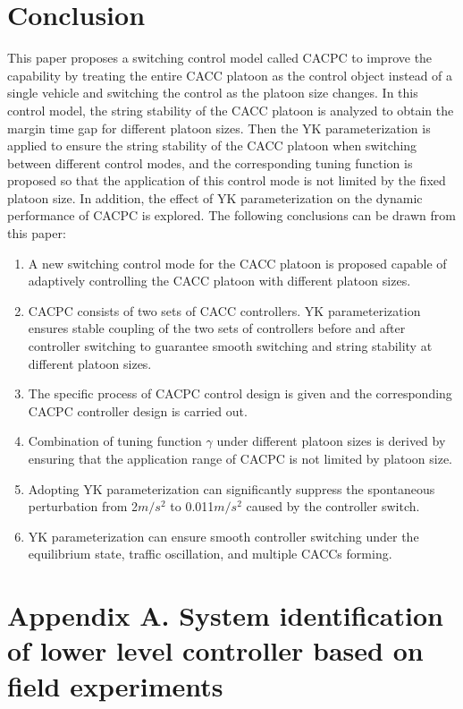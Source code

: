 \documentclass[journal]{IEEEtran}
\begin{document}
\section{Conclusion}
\label{Section 6}

This paper proposes a switching control model called CACPC to improve the capability by treating the entire CACC platoon as the control object instead of a single vehicle and switching the control as the platoon size changes. In this control model, the string stability of the CACC platoon is analyzed to obtain the margin time gap for different platoon sizes. Then the YK parameterization is applied to ensure the string stability of the CACC platoon when switching between different control modes, and the corresponding tuning function is proposed so that the application of this control mode is not limited by the fixed platoon size. In addition, the effect of YK parameterization on the dynamic performance of CACPC is explored. The following conclusions can be drawn from this paper:
\begin{enumerate}
  \item A new switching control mode for the CACC platoon is proposed capable of adaptively controlling the CACC platoon with different platoon sizes.
  \item CACPC consists of two sets of CACC controllers. YK parameterization ensures stable coupling of the two sets of controllers before and after controller switching to guarantee smooth switching and string stability at different platoon sizes.
  \item The specific process of CACPC control design is given and the corresponding CACPC controller design is carried out.
  \item Combination of tuning function $\gamma$ under different platoon sizes is derived by ensuring that the application range of CACPC is not limited by platoon size.
  \item Adopting YK parameterization can significantly suppress the spontaneous perturbation from 2$m/s^2$ to 0.011$m/s^2$ caused by the controller switch.
  \item YK parameterization can ensure smooth controller switching under the equilibrium state, traffic oscillation, and multiple CACCs forming.
\end{enumerate}





\appendices
\section*{Appendix A. System identification of lower level controller based on field experiments}
\label{AppendixA}
\end{document}
